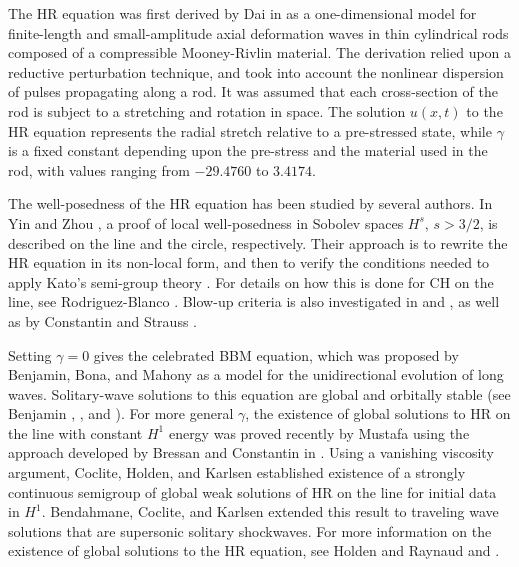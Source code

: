 \documentclass[12pt,reqno]{amsart}
\theoremstyle{plain}  %
\theoremstyle{definition}
\begin{document}
The HR equation was first
derived by Dai in \cite{Dai_1998_Model-equations} as a one-dimensional 
model for finite-length and
small-amplitude axial deformation waves in thin cylindrical
rods composed of a compressible Mooney-Rivlin
material. The derivation relied upon a reductive perturbation technique, 
and took into account the nonlinear dispersion of pulses propagating 
along a rod. It was assumed that each cross-section of the rod is 
subject to a stretching and rotation in space. The solution $u(x,t)$ to the 
HR equation represents the radial stretch relative
to a pre-stressed state, while $\gamma$ is a fixed constant depending upon 
the pre-stress and the material used in
the rod, with values ranging from $- 29.4760$ to $3.4174$.

%
The well-posedness of the HR equation has been studied by several authors. 
In Yin \cite{Yin_2003_On-the-Cauchy-p} and Zhou 
\cite{Zhou_2005_Local-well-pose}, a proof of local well-posedness in Sobolev 
spaces $H^s$,  $s > 3/2$, is described  on the line and the circle, respectively. 
Their approach is to rewrite the HR equation   
in its non-local form, and then to verify the conditions needed to apply 
Kato's semi-group theory \cite{Kato_1975_Quasi-linear-eq}. 
For details on how this is done for CH on the line, see Rodriguez-Blanco 
\cite{Rodriguez-Blanco_2001_On-the-Cauchy-p}. Blow-up criteria 
is also investigated in \cite{Yin_2003_On-the-Cauchy-p} and 
\cite{Zhou_2005_Local-well-pose}, as well as by Constantin and Strauss 
\cite{Constantin_2000_Stability-of-a-}. 


Setting $\gamma = 0$ gives the celebrated 
BBM equation, which was proposed by 
Benjamin, Bona, and Mahony 
\cite{Benjamin_1972_Model-equations} as a model for 
the unidirectional evolution of long waves.
Solitary-wave solutions to this 
equation are global and orbitally stable (see Benjamin 
\cite{Benjamin_1972_The-stability-o}, 
\cite{Benjamin_1972_Model-equations}, and 
\cite{Constantin_2000_Stability-of-a-}).
For more general $\gamma$, the existence of global 
solutions to HR on the line with constant $H^1$ energy
was proved recently by Mustafa \cite{Mustafa_2007_Global-conserva}
using the approach developed by Bressan and 
Constantin in \cite{Bressan_2007_Global-conserva}. Using a vanishing 
viscosity argument, Coclite, 
Holden, and Karlsen \cite{Coclite_2005_Global-weak-sol}
established existence of a strongly continuous semigroup of global 
weak solutions of HR on the line for initial data in $H^1$.
Bendahmane, Coclite, and Karlsen 
\cite{Bendahmane_2006_Hsp-1-perturbat} extended this result to traveling 
wave solutions that are supersonic solitary shockwaves.
For more information on the existence of global solutions to the HR
equation, see Holden and Raynaud \cite{Holden_2007_Global-conserva}
and \cite{Yin_2003_On-the-Cauchy-p}. 
\end{document}
